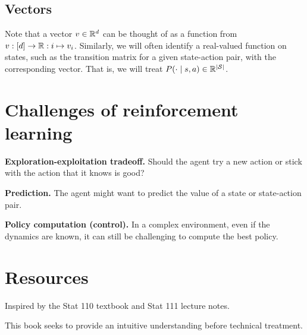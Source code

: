 \documentclass[\main/main]{subfiles}
\begin{document}
\subsection{Vectors}

Note that a vector $v \in \mathbb{R}^d$ can be thought of as a function from $v : [d] \to \mathbb{R} : i \mapsto v_i$.
Similarly, we will often identify a real-valued function on states, such as the transition matrix for a given state-action pair,
with the corresponding vector. That is, we will treat $P(\cdot \mid s, a) \in \mathbb{R}^{|\mathcal{S}|}$.

\section{Challenges of reinforcement learning}

\textbf{Exploration-exploitation tradeoff.} Should the agent try a new action or stick with the action that it knows is good?

\textbf{Prediction.} The agent might want to predict the value of a state or state-action pair.

\textbf{Policy computation (control).} In a complex environment, even if the dynamics are known, it can still be challenging to compute the best policy.


\section{Resources}

Inspired by the Stat 110 textbook and Stat 111 lecture notes.

This book seeks to provide an intuitive understanding before technical treatment.

\end{document}
